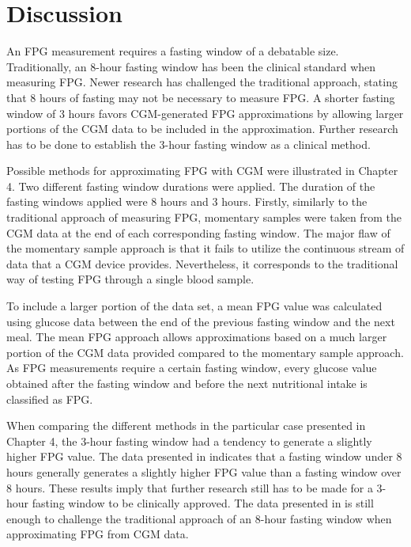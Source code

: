 \documentclass[english, 12pt, a4paper, elec, utf8, a-1b, online]{aaltothesis}
\begin{document}
\section{Discussion}
An FPG measurement requires a fasting window of a debatable size. Traditionally, an 8-hour 
fasting window has been the clinical standard when measuring 
FPG\cite{the_expert_committee_on_the_diagnosis_and_classification_of_diabetes_mellitus_report_1997}. 
Newer research has challenged the traditional approach, stating that 8 hours of fasting may not be necessary to measure 
FPG\cite{moebus_impact_2011}. A shorter fasting window of 3 hours favors CGM-generated FPG approximations by  
allowing larger portions of the CGM data to be included in the approximation. Further research has to be done to
establish the 3-hour fasting window as a clinical method.

Possible methods for approximating FPG with CGM were illustrated in Chapter 4. Two different fasting window durations were applied.
The duration of the fasting windows applied were 8 hours\cite{the_expert_committee_on_the_diagnosis_and_classification_of_diabetes_mellitus_report_1997} 
and 3 hours\cite{moebus_impact_2011}. Firstly, similarly to the traditional approach of measuring FPG, 
momentary samples were taken from the CGM data at the end of each corresponding fasting window. The major flaw of the momentary sample 
approach is that it fails to utilize the continuous stream of data that a CGM device provides. Nevertheless, it corresponds to the 
traditional way of testing FPG through a single blood sample.

To include a larger portion of the data set, a mean FPG value was calculated using glucose data between the end of the 
previous fasting window and the next meal. The mean FPG approach allows approximations based on a much larger portion of 
the CGM data provided compared to the momentary sample approach. As FPG measurements require a certain fasting window, every 
glucose value obtained after the fasting window and before the next nutritional intake is classified as FPG.

When comparing the different methods in the particular case presented in Chapter 4, the 3-hour fasting 
window had a tendency to generate a slightly higher FPG value. The data presented in \cite{moebus_impact_2011} indicates that 
a fasting window under 8 hours generally generates a slightly higher FPG value than a fasting window over 8 hours.
These results imply that further research still has to be made for a 3-hour fasting window to be clinically approved\cite {moebus_impact_2011}.
The data presented in \cite{moebus_impact_2011} is still enough to challenge the traditional approach of an 8-hour fasting window when 
approximating FPG from CGM data.
\end{document}
